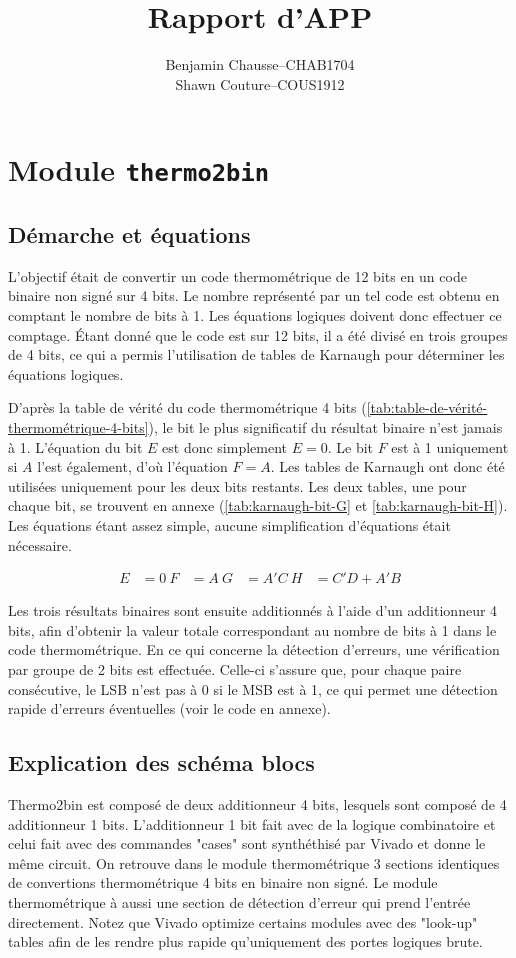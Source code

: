\documentclass[a11paper]{article}
\title{Rapport d'APP}
\author{
  \addtolength{\tabcolsep}{-0.4em}
  \begin{tabular}{rcl} %
      Benjamin Chausse & -- & CHAB1704 \\
      Shawn Couture    & -- & COUS1912 \\
  \end{tabular}
}
\begin{document}
\maketitle
\newpage
\tableofcontents
\newpage

\section{Module \texttt{thermo2bin}}
\subsection{Démarche et équations}

L’objectif était de convertir un code thermométrique de 12 bits en un code
binaire non signé sur 4 bits. Le nombre représenté par un tel code est obtenu
en comptant le nombre de bits à 1. Les équations logiques doivent donc
effectuer ce comptage. Étant donné que le code est sur 12 bits, il a été
divisé en trois groupes de 4 bits, ce qui a permis l'utilisation de tables de
Karnaugh pour déterminer les équations logiques.

D'après la table de vérité du code thermométrique 4 bits
(\ref{tab:table-de-vérité-thermométrique-4-bits}), le bit le plus
significatif du résultat binaire n’est jamais à 1. L'équation du bit $E$ est
donc simplement $E = 0$. Le bit $F$ est à 1 uniquement si $A$ l’est
également, d’où l’équation $F = A$. Les tables de Karnaugh ont donc été
utilisées uniquement pour les deux bits restants. Les deux tables, une pour
chaque bit, se trouvent en annexe (\ref{tab:karnaugh-bit-G} et
\ref{tab:karnaugh-bit-H}). Les équations étant assez simple, aucune simplification d'équations était nécessaire.

\begin{align}
	E & = 0 \
	F & = A \
	G & = A'C \
	H & = C'D + A'B
\end{align}

Les trois résultats binaires sont ensuite additionnés à l’aide d’un
additionneur 4 bits, afin d’obtenir la valeur totale correspondant au nombre
de bits à 1 dans le code thermométrique. En ce qui concerne la détection
d'erreurs, une vérification par groupe de 2 bits est effectuée. Celle-ci
s’assure que, pour chaque paire consécutive, le LSB n’est pas à 0 si le MSB
est à 1, ce qui permet une détection rapide d’erreurs éventuelles (voir le
code en annexe).

\subsection{Explication des schéma blocs}
Thermo2bin est composé de deux additionneur 4 bits, lesquels sont composé de 4 additionneur 1 bits. L'additionneur 1 bit fait avec de la
logique combinatoire et celui fait avec des commandes "cases" sont synthéthisé par Vivado et donne le même circuit. On retrouve dans le
module thermométrique 3 sections identiques de convertions thermométrique 4 bits en binaire non signé. Le module thermométrique à aussi
une section de détection d'erreur qui prend l'entrée directement. Notez que Vivado optimize certains modules avec des "look-up" tables
afin de les rendre plus rapide qu'uniquement des portes logiques brute.
\end{document}

